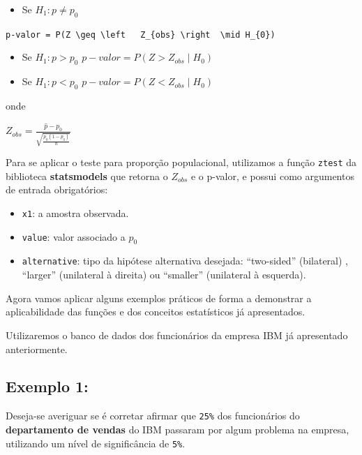 \documentclass[
  letterpaper,
  DIV=11,
  numbers=noendperiod]{scrreprt}
\providecommand{\tightlist}{%
  \setlength{\itemsep}{0pt}\setlength{\parskip}{0pt}}\usepackage{longtable,booktabs,array}
\begin{document}
\begin{itemize}
\tightlist
\item
  Se \(H_{1}: p \neq p_{0}\)
\end{itemize}

\texttt{p-valor\ =\ P(Z\ \textbackslash{}geq\ \textbackslash{}left\ \ \ Z\_\{obs\}\ \textbackslash{}right\ \ \textbackslash{}mid\ H\_\{0\})}

\begin{itemize}
\item
  Se \(H_{1}: p > p_{0}\) \(p-valor = P (Z > Z_{obs}\mid H_{0})\)
\item
  Se \(H_{1}: p < p_{0}\) \(p-valor = P (Z < Z_{obs}\mid H_{0})\)
\end{itemize}

onde

\(Z_{obs} = \frac{\hat{p}-p_{0}}{\sqrt{\frac{p_{0}\left ( 1 - p_{0} \right )}{n}}}\)

Para se aplicar o teste para proporção populacional, utilizamos a função
\texttt{ztest} da biblioteca \textbf{statsmodels} que retorna o
\(Z_{obs}\) e o p-valor, e possui como argumentos de entrada
obrigatórios:

\begin{itemize}
\tightlist
\item
  \texttt{x1}: a amostra observada.
\item
  \texttt{value}: valor associado a \(p_{0}\)
\item
  \texttt{alternative}: tipo da hipótese alternativa desejada:
  ``two-sided'' (bilateral) , ``larger'' (unilateral à direita) ou
  ``smaller'' (unilateral à esquerda).
\end{itemize}

Agora vamos aplicar alguns exemplos práticos de forma a demonstrar a
aplicabilidade das funções e dos conceitos estatísticos já apresentados.

Utilizaremos o banco de dados dos funcionários da empresa IBM já
apresentado anteriormente.

\hypertarget{exemplo-1-1}{%
\subsection{Exemplo 1:}\label{exemplo-1-1}}

Deseja-se averiguar se é corretar afirmar que \texttt{25\%} dos
funcionários do \textbf{departamento de vendas} do IBM passaram por
algum problema na empresa, utilizando um nível de significância de
\texttt{5\%}.
\end{document}
